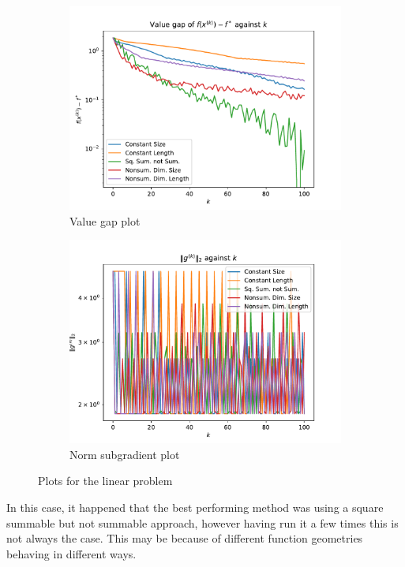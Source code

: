 \documentclass[journal,onecolumn]{IEEEtran}
\begin{document}
\begin{figure}[htbp]
    \centering
    \begin{subfigure}{0.49\textwidth}
        \centering
        \includegraphics[width = \linewidth]{Figures/Linear Example Value Gap.pdf}
        \caption{Value gap plot}
        \label{fig:linear value gap}
    \end{subfigure}
    \begin{subfigure}{0.49\textwidth}
        \centering
        \includegraphics[width = \linewidth]{Figures/Linear Example Subgradient Norm.pdf}
        \caption{Norm subgradient plot}
        \label{fig:linear sg norm}
    \end{subfigure}
    \caption{Plots for the linear problem}
    \label{fig:gd}
\end{figure}
In this case, it happened that the best performing method was using a square summable but not summable approach, however having run it a few times this is not always the case. This may be because of different function geometries behaving in different ways.
\end{document}

